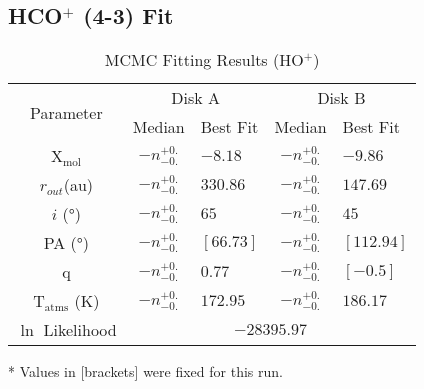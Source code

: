 \subsection{HCO$^+$ (4-3) Fit}

\begin{table}
  \begin{threeparttable}
    \centering
    \caption{MCMC Fitting Results (HO$^+$)}
    \label{table:fit_hco}
    \renewcommand{\arraystretch}{1.2}
    \begin{tabular}{c c l c l }
      \toprule \toprule
      \multirow{2}{*}{Parameter} & \multicolumn{2}{c}{Disk A} & \multicolumn{2}{c}{Disk B} \\
                                 & Median & Best Fit          & Median & Best Fit \\
      \midrule %
      X$_\text{mol}$             & $ -n _{-0.} ^{+0.}$ & $-8.18$    & $ -n _{-0.} ^{+0.}$ & $-9.86$ \\
      $r_{out}$(\si{au})        & $ -n _{-0.} ^{+0.}$ & $330.86$    & $ -n _{-0.} ^{+0.}$  & $147.69$    \\
      $i$ (\si{\degree})        & $ -n _{-0.} ^{+0.}$ & $65$    & $ -n _{-0.} ^{+0.}$ & $45$    \\
      PA  (\si{\degree})        & $ -n _{-0.} ^{+0.}$ & $[66.73]$  & $ -n _{-0.} ^{+0.}$  & $[112.94]$  \\
      q                         & $ -n _{-0.} ^{+0.}$ & $0.77$  & $ -n _{-0.} ^{+0.}$  & $[-0.5]$  \\
      T$_\text{atms}$ (\si{\K}) & $ -n _{-0.} ^{+0.}$ & $172.95 $  & $ -n _{-0.} ^{+0.}$  & $186.17$  \\
      $\ln$ Likelihood          & \multicolumn{4}{c}{$-28395.97$} \\
      \bottomrule
    \end{tabular}
    \begin{tablenotes}\footnotesize
      \item[*] Values in [brackets] were fixed for this run.
    \end{tablenotes}
  \end{threeparttable}
\end{table}









